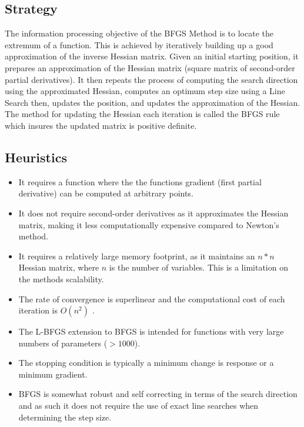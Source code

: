 \subsection{Strategy}
The information processing objective of the BFGS Method is to locate the extremum of a function. 
This is achieved by iteratively building up a good approximation of the inverse Hessian matrix.
Given an initial starting position, it prepares an approximation of the Hessian matrix (square matrix of second-order partial derivatives). It then repeats the process of computing the search direction using the approximated Hessian, computes an optimum step size using a Line Search then, updates the position, and updates the approximation of the Hessian. The method for updating the Hessian each iteration is called the BFGS rule which insures the updated matrix is positive definite.

\subsection{Heuristics}

\begin{itemize}
	\item It requires a function where the the functions gradient (first partial derivative) can be computed at arbitrary points.
	\item It does not require second-order derivatives as it approximates the Hessian matrix, making it less computationally expensive compared to Newton's method.
	\item It requires a relatively large memory footprint, as it maintains an $n*n$ Hessian matrix, where $n$ is the number of variables. This is a limitation on the methods scalability.
	\item The rate of convergence is superlinear and the computational cost of each iteration is $O(n^2)$ \cite{Nocedal1999}.
	\item The L-BFGS extension to BFGS is intended for functions with very large numbers of parameters ($>1000$).
	\item The stopping condition is typically a minimum change is response or a minimum gradient.
	\item BFGS is somewhat robust and self correcting in terms of the search direction and as such it does not require the use of exact line searches when determining the step size.
\end{itemize}

